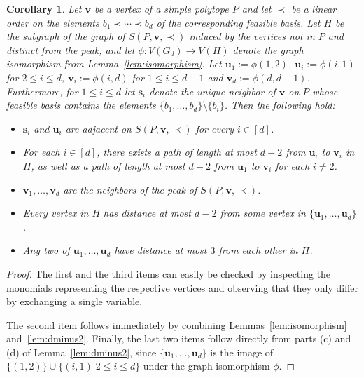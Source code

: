 \documentclass[centering,11pt,reqno]{amsart}
\newtheorem{cor}[theorem]{Corollary}
\theoremstyle{definition}
\begin{document}
\begin{cor}
\label{cor:d-2paths}
Let $\mathbf{v}$ be a vertex of a simple polytope $P$ and let $\prec$ be a linear order on the elements $b_1\prec\cdots\prec b_d$ of the corresponding feasible basis. Let $H$ be the subgraph of the graph of $S(P,\mathbf{v},\prec)$ induced by the vertices not in $P$ and distinct from the peak, and let $\phi:V(G_d)\rightarrow V(H)$ denote the graph isomorphism from Lemma~\ref{lem:isomorphism}. Let $\mathbf{u}_1:=\phi(1,2)$, $\mathbf{u}_i:=\phi(i,1)$ for $2\le i\le d$, $\mathbf{v}_i:=\phi(i,d)$ for $1\le i\le d-1$ and $\mathbf{v}_d:=\phi(d,d-1)$. Furthermore, for $1\le i \le d$ let $\mathbf{s}_i$ denote the unique neighbor of $\mathbf{v}$ on $P$ whose feasible basis contains the elements $\{b_1,\ldots,b_d\}\setminus \{b_i\}$. Then the following hold:

\begin{itemize}
    \item $\mathbf{s}_i$ and $\mathbf{u}_i$ are adjacent on $S(P,\mathbf{v},\prec)$ for every $i\in [d]$.
    \item For each $i\in [d]$, there exists a path of length at most $d-2$ from $\mathbf{u}_i$ to $\mathbf{v}_i$ in $H$, as well as a path of length at most $d-2$ from $\mathbf{u}_1$ to $\mathbf{v}_i$ for each $i\neq 2$.
    \item $\mathbf{v}_1,\ldots,\mathbf{v}_d$ are the neighbors of the peak of $S(P,\mathbf{v},\prec)$.
    \item Every vertex in $H$ has distance at most $d-2$ from some vertex in $\{\mathbf{u}_1,\ldots,\mathbf{u}_d\}$.
    \item Any two of $\mathbf{u}_1,\ldots,\mathbf{u}_d$ have distance at most $3$ from each other in $H$.
\end{itemize}
\end{cor}
\begin{proof}
The first and the third items can easily be checked by inspecting the monomials representing the respective vertices and observing that they only differ by exchanging a single variable.

The second item follows immediately by combining Lemmas~\ref{lem:isomorphism} and~\ref{lem:dminus2}. Finally, the last two items follow directly from parts (c) and (d) of Lemma~\ref{lem:dminus2}, since $\{\mathbf{u}_1,\ldots,\mathbf{u}_d\}$ is the image of $\{(1,2)\}\cup \{(i,1)|2\le i \le d\}$ under the graph isomorphism $\phi$.
\end{proof}


\end{document}

